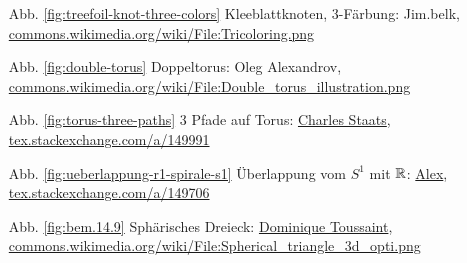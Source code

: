 \begin{itemize}
    \item[Abb. \ref{fig:treefoil-knot-three-colors}] Kleeblattknoten, 3-Färbung: Jim.belk, \href{https://commons.wikimedia.org/wiki/File:Tricoloring.png}{commons.wikimedia.org/wiki/File:Tricoloring.png}
    \item[Abb. \ref{fig:double-torus}] Doppeltorus: Oleg Alexandrov, \href{https://commons.wikimedia.org/wiki/File:Double_torus_illustration.png}{commons.wikimedia.org/wiki/File:Double\_torus\_illustration.png}
    \item[Abb. \ref{fig:torus-three-paths}] 3 Pfade auf Torus: \href{http://tex.stackexchange.com/users/484/charles-staats}{Charles Staats}, \href{http://tex.stackexchange.com/a/149991/5645}{tex.stackexchange.com/a/149991}
    \item[Abb. \ref{fig:ueberlappung-r1-spirale-s1}] Überlappung vom $S^1$ mit $\mathbb{R}$: \href{http://tex.stackexchange.com/users/22467/alex}{Alex}, \href{http://tex.stackexchange.com/a/149706/5645}{tex.stackexchange.com/a/149706}
    \item[Abb. \ref{fig:bem.14.9}] Sphärisches Dreieck: \href{https://commons.wikimedia.org/wiki/User:DemonDeLuxe}{Dominique Toussaint},\\
        \href{https://commons.wikimedia.org/wiki/File:Spherical_triangle_3d_opti.png}{commons.wikimedia.org/wiki/File:Spherical\_triangle\_3d\_opti.png}
\end{itemize}
